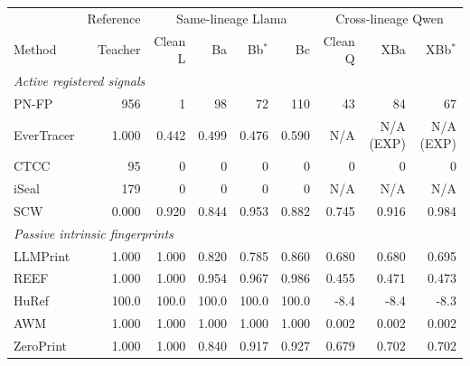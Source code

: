 \setlength{\tabcolsep}{3pt}\small
\begin{tabular}{lrrrrrrrr}
\toprule
& Reference & \multicolumn{4}{c}{Same-lineage Llama} & \multicolumn{3}{c}{Cross-lineage Qwen} \\
\cmidrule(lr){2-2}\cmidrule(lr){3-6}\cmidrule(lr){7-9}
Method & Teacher & Clean L & Ba & Bb$^*$ & Bc & Clean Q & XBa & XBb$^*$ \\
\midrule
\multicolumn{9}{l}{\textit{Active registered signals}} \\
PN-FP & 956 & 1 & 98 & 72 & 110 & 43 & 84 & 67 \\
EverTracer & 1.000 & 0.442 & 0.499 & 0.476 & 0.590 & N/A & N/A (EXP) & N/A (EXP) \\
CTCC & 95 & 0 & 0 & 0 & 0 & 0 & 0 & 0 \\
iSeal & 179 & 0 & 0 & 0 & 0 & N/A & N/A & N/A \\
SCW & 0.000 & 0.920 & 0.844 & 0.953 & 0.882 & 0.745 & 0.916 & 0.984 \\
\midrule\multicolumn{9}{l}{\textit{Passive intrinsic fingerprints}} \\
LLMPrint & 1.000 & 1.000 & 0.820 & 0.785 & 0.860 & 0.680 & 0.680 & 0.695 \\
REEF & 1.000 & 1.000 & 0.954 & 0.967 & 0.986 & 0.455 & 0.471 & 0.473 \\
HuRef & 100.0 & 100.0 & 100.0 & 100.0 & 100.0 & -8.4 & -8.4 & -8.3 \\
AWM & 1.000 & 1.000 & 1.000 & 1.000 & 1.000 & 0.002 & 0.002 & 0.002 \\
ZeroPrint & 1.000 & 1.000 & 0.840 & 0.917 & 0.927 & 0.679 & 0.702 & 0.702 \\
\bottomrule
\end{tabular}
